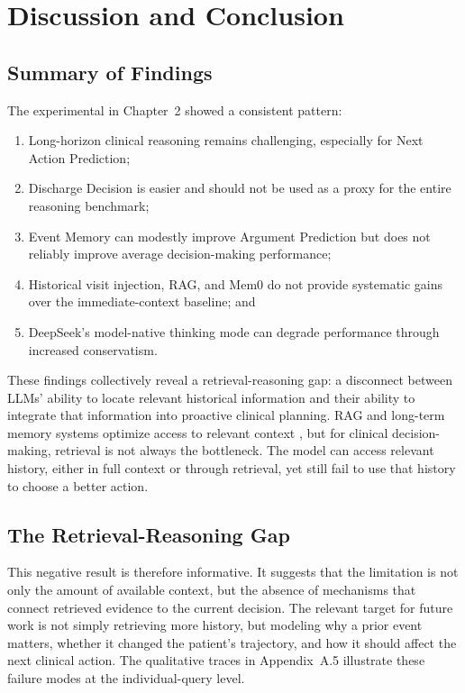\chapter{Discussion and Conclusion}

\section{Summary of Findings}

The experimental in Chapter~2 showed a consistent pattern: 
\begin{enumerate}
    \item Long-horizon clinical reasoning remains challenging, especially for Next Action Prediction;
    \item Discharge Decision is easier and should not be used as a proxy for the entire reasoning benchmark;
    \item Event Memory can modestly improve Argument Prediction but does not reliably improve average decision-making performance;
    \item Historical visit injection, RAG, and Mem0 do not provide systematic gains over the immediate-context baseline; and
    \item DeepSeek's model-native thinking mode can degrade performance through increased conservatism.
\end{enumerate}

These findings collectively reveal a retrieval-reasoning gap: a disconnect between LLMs' ability to locate relevant historical information and their ability to integrate that information into proactive clinical planning. RAG and long-term memory systems optimize access to relevant context \cite{lewis2020rag,mem0_reference,amem2025,amabench2026}, but for clinical decision-making, retrieval is not always the bottleneck. The model can access relevant history, either in full context or through retrieval, yet still fail to use that history to choose a better action.

\section{The Retrieval-Reasoning Gap}


This negative result is therefore informative. It suggests that the limitation is not only the amount of available context, but the absence of mechanisms that connect retrieved evidence to the current decision. The relevant target for future work is not simply retrieving more history, but modeling why a prior event matters, whether it changed the patient's trajectory, and how it should affect the next clinical action. The qualitative traces in Appendix~A.5 illustrate these failure modes at the individual-query level.

